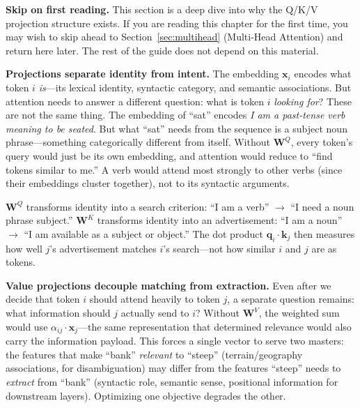 \begin{notebox}
\textbf{Skip on first reading.} This section is a deep dive into why the Q/K/V projection structure exists. If you are reading this chapter for the first time, you may wish to skip ahead to Section~\ref{sec:multihead} (Multi-Head Attention) and return here later. The rest of the guide does not depend on this material.
\end{notebox}

\textbf{Projections separate identity from intent.}\hspace{1em} The embedding $\mathbf{x}_i$ encodes what token $i$ \emph{is}---its lexical identity, syntactic category, and semantic associations. But attention needs to answer a different question: what is token $i$ \emph{looking for}? These are not the same thing. The embedding of ``sat'' encodes \emph{I am a past-tense verb meaning to be seated}. But what ``sat'' needs from the sequence is a subject noun phrase---something categorically different from itself. Without $\mathbf{W}^Q$, every token's query would just be its own embedding, and attention would reduce to ``find tokens similar to me.'' A verb would attend most strongly to other verbs (since their embeddings cluster together), not to its syntactic arguments.

$\mathbf{W}^Q$ transforms identity into a search criterion: ``I am a verb'' $\to$ ``I need a noun phrase subject.'' $\mathbf{W}^K$ transforms identity into an advertisement: ``I am a noun'' $\to$ ``I am available as a subject or object.'' The dot product $\mathbf{q}_i \cdot \mathbf{k}_j$ then measures how well $j$'s advertisement matches $i$'s search---not how similar $i$ and $j$ are as tokens.

\textbf{Value projections decouple matching from extraction.}\hspace{1em} Even after we decide that token $i$ should attend heavily to token $j$, a separate question remains: what information should $j$ actually send to $i$? Without $\mathbf{W}^V$, the weighted sum would use $\alpha_{ij} \cdot \mathbf{x}_j$---the same representation that determined relevance would also carry the information payload. This forces a single vector to serve two masters: the features that make ``bank'' \emph{relevant} to ``steep'' (terrain/geography associations, for disambiguation) may differ from the features ``steep'' needs to \emph{extract} from ``bank'' (syntactic role, semantic sense, positional information for downstream layers). Optimizing one objective degrades the other.

